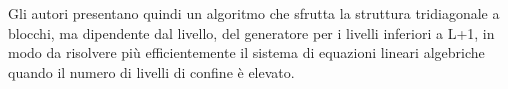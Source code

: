\documentclass[11pt]{article}
\begin{document}
Gli autori presentano quindi un algoritmo che sfrutta la struttura tridiagonale a blocchi, ma dipendente dal livello, del generatore per i livelli inferiori a L+1, in modo da risolvere più efficientemente il sistema di equazioni lineari algebriche quando il numero di livelli di confine è elevato. \\





\end{document}
